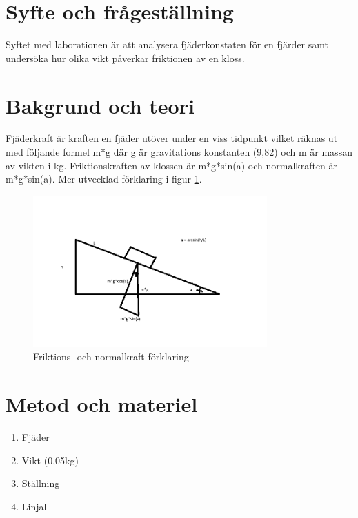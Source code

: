\documentclass[11p, titlepage, oneside, a4paper]{article}
\begin{document}
	\newpage

	
	\setlength{\parindent}{0pt}
	\setlength{\parskip}{10pt}
	
	\section{Syfte och frågeställning}
        Syftet med laborationen är att analysera fjäderkonstaten för en fjärder samt undersöka hur olika vikt påverkar friktionen av en kloss.

	\section{Bakgrund och teori}
	    Fjäderkraft är kraften en fjäder utöver under en viss tidpunkt vilket räknas ut med följande formel m*g där g är gravitations konstanten (9,82) och m är massan av vikten i kg. Friktionskraften av klossen är m*g*sin(a) och normalkraften är m*g*sin(a). Mer utvecklad förklaring i figur \ref{fig:triangle}.

    \begin{figure}[!h]
        \includegraphics[width=0.8\textwidth]{friktionskraftexplain}
        \caption{Friktions- och normalkraft förklaring}
        \label{fig:triangle}
    \end{figure}


	\section{Metod och materiel}

        \subtitle{Fjäderkraft}

        \begin{enumerate}
            \item Fjäder
            \item Vikt (0,05kg)
            \item Ställning
            \item Linjal
        \end{enumerate}
        
\end{document}
